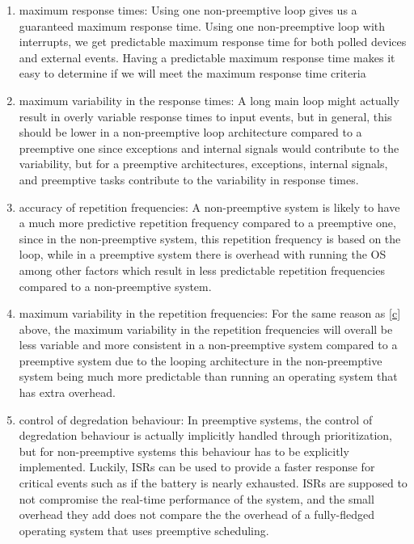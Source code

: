 \begin{enumerate}[label={\alph*)}]
  \item maximum response times:
    Using one non-preemptive loop gives us a guaranteed maximum response time. 
    Using one non-preemptive loop with interrupts, we get predictable maximum
    response time for both polled devices and external events.
    Having a predictable maximum response time makes it easy to determine if
    we will meet the maximum response time criteria

  \item maximum variability in the response times: 
    A long main loop might actually result in overly variable response times to
    input events, but in general, this should be lower in a non-preemptive loop
    architecture compared to a preemptive one since exceptions and internal
    signals would contribute to the variability, but for a preemptive
    architectures,  exceptions, internal signals, and preemptive tasks
    contribute to the variability in response times. 

  \item accuracy of repetition frequencies:\label{c}
    A non-preemptive system is likely to have a much more predictive repetition
    frequency compared to a preemptive one, since in the non-preemptive system,
    this repetition frequency is based on the loop, while in a preemptive
    system there is overhead with running the OS among other factors which
    result in less predictable repetition frequencies compared to a
    non-preemptive system.

  \item maximum variability in the repetition frequencies:
    For the same reason as \ref{c} above, the maximum variability in the
    repetition frequencies will overall be less variable and more consistent in
    a non-preemptive system compared to a preemptive system due to the looping
    architecture in the non-preemptive system being much more predictable than
    running an operating system that has extra overhead.

  \item control of degredation behaviour:
    In preemptive systems, the control of degredation behaviour is actually
    implicitly handled through prioritization, but for non-preemptive systems
    this behaviour has to be explicitly implemented. Luckily, ISRs can be used
    to provide a faster response for critical events such as if the battery is
    nearly exhausted. ISRs are supposed to not compromise the real-time
    performance of the system, and the small overhead they add does not compare
    the the overhead of a fully-fledged operating system that uses preemptive
    scheduling.
\end{enumerate}
